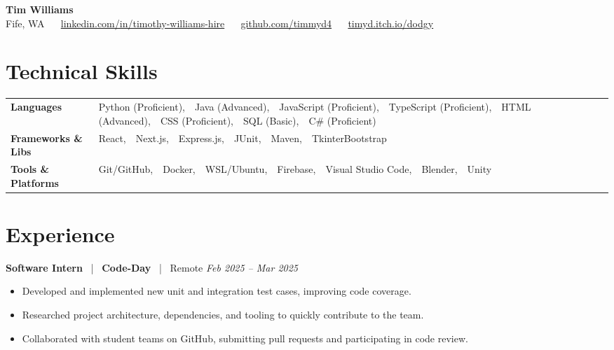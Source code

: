 \documentclass[10pt, letterpaper]{article}
\newcommand{\jobhead}[4]{%
  \vspace{5pt}%
  {\bfseries\color{dark}#1}%
  ~{\color{light}|}~%
  {\bfseries\color{navy}#2}%
  ~{\color{light}|}~%
  {\color{light}#3}%
  \hfill{\color{light}\small\textit{#4}}\\[-2pt]%
}
\newcommand{\skillrow}[2]{%
  {\bfseries #1} & #2 \\[2pt]%
}
\begin{document}

\begin{center}
  {\huge\bfseries\color{navy} Tim Williams}\\[4pt]
  {\small\color{light}
    Fife, WA
    ~\textbullet~
    \href{https://linkedin.com/in/timothy-williams-hire}{linkedin.com/in/timothy-williams-hire}
    ~\textbullet~
    \href{https://github.com/timmyd4}{github.com/timmyd4}
    ~\textbullet~
    \href{https://timyd.itch.io/dodgy}{timyd.itch.io/dodgy}
  }
\end{center}

\vspace{2pt}

\section{Technical Skills}

\begin{tabular}{@{}p{1.6in} p{5.2in}@{}}
  \skillrow{Languages}{Python (Proficient),\ \ Java (Advanced),\ \ JavaScript (Proficient),\ \ TypeScript (Proficient),\ \ HTML (Advanced),\ \ CSS (Proficient),\ \ SQL (Basic),\ \ C\# (Proficient)}
  \skillrow{Frameworks \& Libs}{React,\ \ Next.js,\ \ Express.js,\ \ JUnit,\ \ Maven,\ \ TkinterBootstrap}
  \skillrow{Tools \& Platforms}{Git/GitHub,\ \ Docker,\ \ WSL/Ubuntu,\ \ Firebase,\ \ Visual Studio Code,\ \ Blender,\ \ Unity}
\end{tabular}

\section{Experience}

\jobhead{Software Intern}{Code-Day}{Remote}{Feb 2025 – Mar 2025}
\begin{itemize}
  \item Developed and implemented new unit and integration test cases, improving code coverage.
  \item Researched project architecture, dependencies, and tooling to quickly contribute to the team.
  \item Collaborated with student teams on GitHub, submitting pull requests and participating in code review.
\end{itemize}
\end{document}
